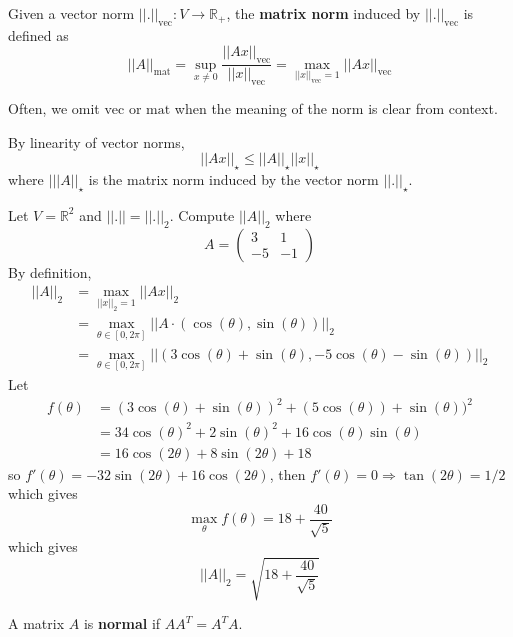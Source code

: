 \begin{definition}
	Given a vector norm $||.||_{\text{vec}}: V \rightarrow \mathbb{R}_+$, the \textbf{matrix norm} induced by $||.||_{\text{vec}}$ is defined as
	\[
		||A||_{\text{mat}} = \sup_{x \ne 0} \frac{||A x||_{\text{vec}}}{||x||_\text{vec}} = \max_{||x||_\text{vec} = 1} ||A x||_{\text{vec}}
	\]
\end{definition}

\begin{remark}
	Often, we omit $\text{vec}$ or $\text{mat}$ when the meaning of the norm is clear from context.
\end{remark}

\begin{example}	
	By linearity of vector norms,
	\[
		||A x||_{\star} \le ||A||_{\star} ||x||_{\star}
		\]
		where $|||A||_{\star}$ is the matrix norm induced by the vector norm $||.||_{\star}$.
\end{example}

\begin{example}
	Let $V = \mathbb{R}^2$ and $||.|| = ||.||_2$. Compute $||A||_2$ where
	\[
		A = \begin{pmatrix}
			3 & 1 \\
			-5 & -1
		\end{pmatrix}
	\]
	By definition,
	\[
		\begin{aligned}
			||A||_2
				& = \max_{||x||_2 = 1} ||A x||_2 \\
				& = \max_{\theta \in [0, 2 \pi]} ||A \cdot (\cos(\theta), \sin(\theta))||_2 \\
				& = \max_{\theta \in [0, 2 \pi]} || (3 \cos(\theta) + \sin(\theta), -5 \cos(\theta) - \sin(\theta)) ||_2
		\end{aligned}
	\]
	Let
	\[
		\begin{aligned}
			f(\theta) 
				& = {(3 \cos(\theta) + \sin(\theta))}^2 + {(5 \cos(\theta)) + \sin(\theta))}^2 \\
				& = 34 {\cos(\theta)}^2 + 2 {\sin(\theta)}^2 + 16 \cos(\theta) \sin(\theta) \\
				& = 16 \cos(2 \theta) + 8 \sin(2 \theta) + 18
		\end{aligned}
	\]
	so $f'(\theta) = -32 \sin(2 \theta) + 16 \cos(2 \theta)$, then $f'(\theta) = 0 \Rightarrow \tan(2 \theta) = 1/2$ which gives
	\[
		\max_{\theta} f(\theta) = 18 + \frac{40}{\sqrt{5}}
	\]
	which gives
	\[
		||A||_2 = \sqrt{18 + \frac{40}{\sqrt{5}}}
	\]
\end{example}

\begin{definition}
	A matrix $A$ is \textbf{normal} if $A A^T = A^T A$.
\end{definition}


